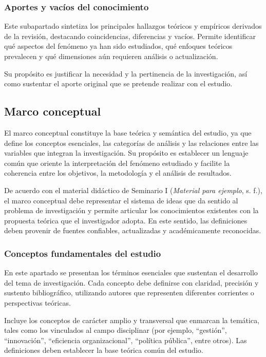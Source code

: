 \subsubsection{Aportes y vacíos del conocimiento}

Este subapartado sintetiza los principales hallazgos teóricos y empíricos derivados de la revisión, destacando coincidencias, diferencias y vacíos. Permite identificar qué aspectos del fenómeno ya han sido estudiados, qué enfoques teóricos prevalecen y qué dimensiones aún requieren análisis o actualización.

Su propósito es justificar la necesidad y la pertinencia de la investigación, así como sustentar el aporte original que se pretende realizar con el estudio.

\subsection{Marco conceptual}

El marco conceptual constituye la base teórica y semántica del estudio, ya que define los conceptos esenciales, las categorías de análisis y las relaciones entre las variables que integran la investigación. Su propósito es establecer un lenguaje común que oriente la interpretación del fenómeno estudiado y facilite la coherencia entre los objetivos, la metodología y el análisis de resultados.

De acuerdo con el material didáctico de Seminario I (\emph{Material para ejemplo}, s. f.), el marco conceptual debe representar el sistema de ideas que da sentido al problema de investigación y permite articular los conocimientos existentes con la propuesta teórica que el investigador adopta. En este sentido, las definiciones deben provenir de fuentes confiables, actualizadas y académicamente reconocidas.

\subsubsection{Conceptos fundamentales del estudio}

En este apartado se presentan los términos esenciales que sustentan el desarrollo del tema de investigación. Cada concepto debe definirse con claridad, precisión y sustento bibliográfico, utilizando autores que representen diferentes corrientes o perspectivas teóricas.


Incluye los conceptos de carácter amplio y transversal que enmarcan la temática, tales como los vinculados al campo disciplinar (por ejemplo, “gestión”, “innovación”, “eficiencia organizacional”, “política pública”, entre otros). Las definiciones deben establecer la base teórica común del estudio.

